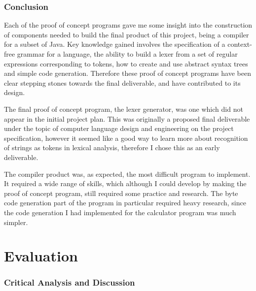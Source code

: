 \documentclass[a4paper, 11pt]{article}
\begin{document}
\newpage\section{Conclusion}
Each of the proof of concept programs gave me some insight into the construction of components needed to build the final product of this project, being a compiler for a subset of Java. Key knowledge gained involves the specification of a context-free grammar for a language, the ability to build a lexer from a set of regular expressions corresponding to tokens, how to create and use abstract syntax trees and simple code generation. Therefore these proof of concept programs have been clear stepping stones towards the final deliverable, and have contributed to its design.

The final proof of concept program, the lexer generator, was one which did not appear in the initial project plan. This was originally a proposed final deliverable under the topic of computer language design and engineering on the project specification, however it seemed like a good way to learn more about recognition of strings as tokens in lexical analysis, therefore I chose this as an early deliverable.

The compiler product was, as expected, the most difficult program to implement. It required a wide range of skills, which although I could develop by making the proof of concept program, still required some practice and research. The byte code generation part of the program in particular required heavy research, since the code generation I had implemented for the calculator program was much simpler.


\newpage\part{Evaluation}

\section{Critical Analysis and Discussion}
\end{document}
